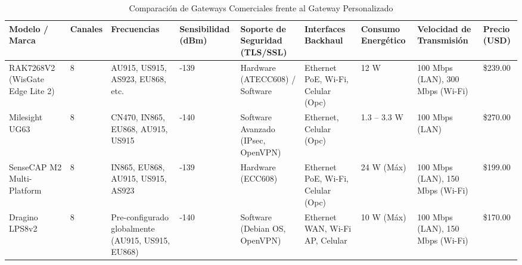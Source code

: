 \begin{landscape}
    \begin{table}[H]
        \centering
        \renewcommand{\arraystretch}{1.4}
        \fontsize{8}{10}\selectfont
        \caption{Comparación de Gateways Comerciales frente al Gateway Personalizado}
        \label{tabla:gateways_comerciales}
        \begin{tabular}{|p{2.5cm}|p{1cm}|p{2.5cm}|p{1.7cm}|p{3cm}|p{2.3cm}|p{1.7cm}|p{2cm}|p{1.3cm}|}
            \hline
            \textbf{Modelo / Marca}                                        & \textbf{Canales}               & \textbf{Frecuencias}                                   & \textbf{Sensibilidad (dBm)}       & \textbf{Soporte de Seguridad (TLS/SSL)}                                & \textbf{Interfaces Backhaul}                      & \textbf{Consumo Energético}            & \textbf{Velocidad de Transmisión}             & \textbf{Precio (USD)}                \\ \hline
            RAK7268V2 (WisGate Edge Lite 2)                                & 8                              & AU915, US915, AS923, EU868, etc.                       & -139                              & Hardware (ATECC608) / Software                                         & Ethernet PoE, Wi-Fi, Celular (Opc)                & 12 W                                   & 100 Mbps (LAN), 300 Mbps (Wi-Fi)              & \$239.00                             \\ \hline
            Milesight UG63                                                 & 8                              & CN470, IN865, EU868, AU915, US915                      & -140                              & Software Avanzado (IPsec, OpenVPN)                                     & Ethernet, Celular (Opc)                           & 1.3 -- 3.3 W                           & 100 Mbps (LAN)                                & \$270.00                             \\ \hline
            SenseCAP M2 Multi-Platform                                     & 8                              & IN865, EU868, AU915, US915, AS923                      & -139                              & Hardware (ECC608)                                                      & Ethernet PoE, Wi-Fi, Celular (Opc)                & 24 W (Máx)                             & 100 Mbps (LAN), 150 Mbps (Wi-Fi)              & \$199.00                             \\ \hline
            Dragino LPS8v2                                                 & 8                              & Pre-configurado globalmente (AU915, US915, EU868)      & -140                              & Software (Debian OS, OpenVPN)                                          & Ethernet WAN, Wi-Fi AP, Celular                   & 10 W (Máx)                             & 100 Mbps (LAN), 150 Mbps (Wi-Fi)              & \$170.00                             \\ \hline

\end{tabular}
\end{table}
\end{landscape}
